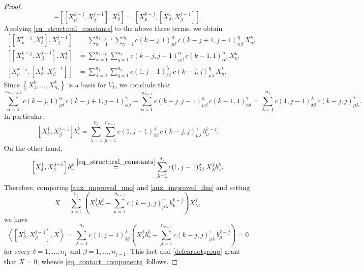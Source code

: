 \documentclass[10pt,a4paper]{amsart}
\begin{document}
\begin{proof}
\begin{equation*}
-
\left[\left[X^{k-j}_\mu,X^{j-1}_\beta\right],X^1_\delta\right]
=
\left[X^{k-j}_\mu,\left[X^1_\delta,X^{j-1}_\beta\right]\right].
\end{equation*}
Applying \eqref{eq_structural_constants} to the above three terms, we obtain
\begin{align*}
\left[\left[X^{k-j}_\mu,X^1_\delta\right],X^{j-1}_\beta\right]
&=
\sum_{\alpha=1}^{n_{k-j+1}}
\sum_{\eta=1}^{n_k}
c(k-j,1)^\alpha_{\mu\delta} \,
c(k-j+1,j-1)^\eta_{\alpha\beta} \,
X^k_\eta,
\\
\left[\left[X^{k-j}_\mu,X^{j-1}_\beta\right],X^1_\delta\right]
&=
\sum_{\alpha=1}^{n_{k-1}}
\sum_{\eta=1}^{n_k}
c(k-j,j-1)^\alpha_{\mu\beta} \,
c(k-1,1)^\eta_{\alpha\delta} \,
X^k_\eta,
\\
\left[X^{k-j}_\mu,\left[X^1_\delta,X^{j-1}_\beta\right]\right]
&=
\sum_{\lambda=1}^{n_j}
\sum_{\eta=1}^{n_k}
c(1,j-1)^\lambda_{\delta\beta} \,
c(k-j,j)^\eta_{\mu\lambda} \,
X^k_\eta.
\end{align*}
Since $\left\{X^k_1,\dots,X^k_{n_k}\right\}$ is a basis for $V_k$, we conclude that 
\begin{equation*}
\sum_{\alpha=1}^{n_{k-j+1}}
c(k-j,1)^\alpha_{\mu\delta} \,
c(k-j+1,j-1)^\gamma_{\alpha\beta}
-
\sum_{\alpha=1}^{n_{k-1}}
c(k-j,j-1)^\alpha_{\mu\beta} \,
c(k-1,1)^\gamma_{\alpha\delta}
=
\sum_{\lambda=1}^{n_j}
c(1,j-1)^\lambda_{\delta\beta} \,
c(k-j,j)^\gamma_{\mu\lambda}.
\end{equation*}
In particular,
\begin{equation}\label{aux_improved_uno}
    \left[X^1_\delta,X^{j-1}_\beta\right]b^k_\gamma
=
\sum_{\lambda=1}^{n_j}
\sum_{\mu=1}^{n_{k-j}}
c(1,j-1)^\lambda_{\delta\beta} \,
c(k-j,j)^\gamma_{\mu\lambda} \,
b^{k-j}_\mu.
\end{equation}
On the other hand,
\begin{equation}\label{aux_improved_due}
\left[X^1_\delta,X^{j-1}_\beta\right]b^k_\gamma\overset{\eqref{eq_structural_constants}}{=}
\sum_{\lambda=1}^{n_j}
c(1,j-1)^\lambda_{\delta\beta} \, X^j_\lambda b^k_\gamma.
\end{equation}
Therefore, comparing \eqref{aux_improved_uno} and \eqref{aux_improved_due} and setting 
\begin{equation*}
    X=\sum_{\lambda=1}^{n_j}
\left(
X^j_\lambda b^k_\gamma
-
\sum_{\mu=1}^{n_{k-j}}
c(k-j,j)^\gamma_{\mu\lambda} \,
b^{k-j}_\mu
\right)X^j_\lambda,
\end{equation*}
we have 
\begin{equation*}
    \left\langle\left[X^1_\delta,X^{j-1}_\beta\right],X\right\rangle=\sum_{\lambda=1}^{n_j}
c(1,j-1)^\lambda_{\delta\beta}
\left(
X^j_\lambda b^k_\gamma
-
\sum_{\mu=1}^{n_{k-j}}
c(k-j,j)^\gamma_{\mu\lambda} \,
b^{k-j}_\mu
\right)=0
\end{equation*}
for every $\delta=1,\ldots,n_1$ and $\beta=1,\ldots,n_{j-1}$. This fact and \eqref{defcarnotgroup} grant that $X=0$, whence \eqref{eq_contact_components} follows.
\end{proof}
\end{document}
